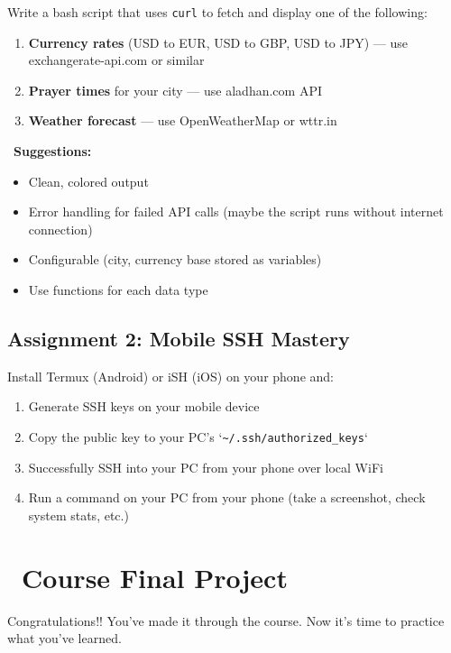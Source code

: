 \documentclass[12pt]{article}
\newcommand{\tipsicon}{\faLightbulb}
\newcommand{\rocketicon}{\faRocket}
\begin{document}
Write a bash script that uses \texttt{curl} to fetch and display one of the following:

\begin{enumerate}
    \item \textbf{Currency rates} (USD to EUR, USD to GBP, USD to JPY) — use exchangerate-api.com or similar
    \item \textbf{Prayer times} for your city — use aladhan.com API
    \item \textbf{Weather forecast} — use OpenWeatherMap or wttr.in
\end{enumerate}

\begin{infobox}
\tipsicon\ \textbf{Suggestions:}
\begin{itemize}
    \item Clean, colored output
    \item Error handling for failed API calls (maybe the script runs without internet connection)
    \item Configurable (city, currency base stored as variables)
    \item Use functions for each data type
\end{itemize}
\end{infobox}

\subsection*{Assignment 2: Mobile SSH Mastery}

Install Termux (Android) or iSH (iOS) on your phone and:

\begin{enumerate}
    \item Generate SSH keys on your mobile device
    \item Copy the public key to your PC's `\verb|~/.ssh/authorized_keys|`
    \item Successfully SSH into your PC from your phone over local WiFi
    \item Run a command on your PC from your phone (take a screenshot, check system stats, etc.)
\end{enumerate}

\section*{\rocketicon\ Course Final Project}

Congratulations!! You've made it through the course. Now it's time to practice what you've learned.
\end{document}
